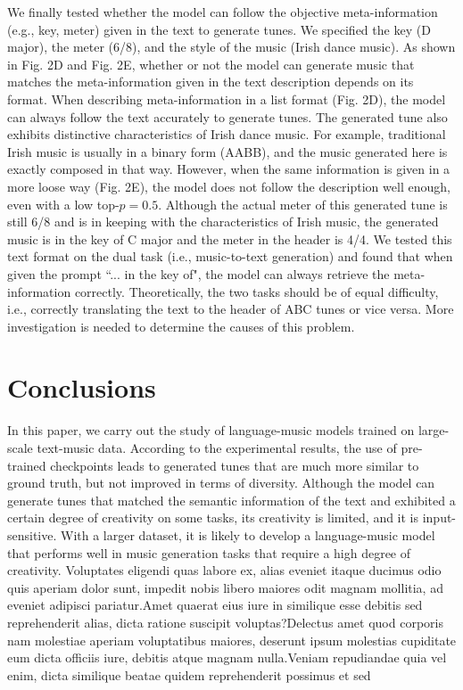\documentclass[letterpaper]{article} %
\begin{document}
We finally tested whether the model can follow the objective meta-information (e.g., key, meter) given in the text to generate tunes. We specified the key (D major), the meter (6/8), and the style of the music (Irish dance music). As shown in Fig. 2D and Fig. 2E, whether or not the model can generate music that matches the meta-information given in the text description depends on its format. When describing meta-information in a list format (Fig. 2D), the model can always follow the text accurately to generate tunes. The generated tune also exhibits distinctive characteristics of Irish dance music. For example, traditional Irish music is usually in a binary form (AABB), and the music generated here is exactly composed in that way. However, when the same information is given in a more loose way (Fig. 2E), the model does not follow the description well enough, even with a low top-$p=0.5$. Although the actual meter of this generated tune is still 6/8 and is in keeping with the characteristics of Irish music, the generated music is in the key of C major and the meter in the header is 4/4. We tested this text format on the dual task (i.e., music-to-text generation) and found that when given the prompt ``... in the key of", the model can always retrieve the meta-information correctly. Theoretically, the two tasks should be of equal difficulty, i.e., correctly translating the text to the header of ABC tunes or vice versa. More investigation is needed to determine the causes of this problem.

\section{Conclusions}
In this paper, we carry out the study of language-music models trained on large-scale text-music data. According to the experimental results, the use of pre-trained checkpoints leads to generated tunes that are much more similar to ground truth, but not improved in terms of diversity. Although the model can generate tunes that matched the semantic information of the text and exhibited a certain degree of creativity on some tasks, its creativity is limited, and it is input-sensitive. With a larger dataset, it is likely to develop a language-music model that performs well in music generation tasks that require a high degree of creativity.
Voluptates eligendi quas labore ex, alias eveniet itaque ducimus odio quis aperiam dolor sunt, impedit nobis libero maiores odit magnam mollitia, ad eveniet adipisci pariatur.Amet quaerat eius iure in similique esse debitis sed reprehenderit alias, dicta ratione suscipit voluptas?Delectus amet quod corporis nam molestiae aperiam voluptatibus maiores, deserunt ipsum molestias cupiditate eum dicta officiis iure, debitis atque magnam nulla.Veniam repudiandae quia vel enim, dicta similique beatae quidem reprehenderit possimus et sed

\end{document}
